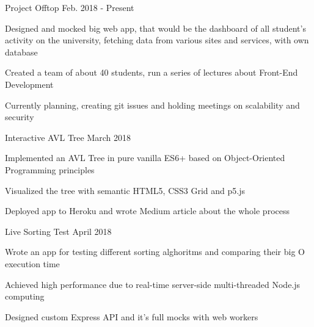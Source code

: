 
\begin{cventries}

  \cventryproject
  {Project Offtop} %
  {Feb. 2018 - Present} %
    {
      \begin{cvitems} %
        \item Designed and mocked big web app, that would be the dashboard of all student's activity on the university, fetching data from various sites and services, with own database
        \item Created a team of about 40 students, run a series of lectures about Front-End Development
        \item Currently planning, creating git issues and holding meetings on scalability and security
        \end{cvitems}
    }

\cventryproject
  {Interactive AVL Tree} %
  {March 2018} %
  {
    \begin{cvitems} %
      \item Implemented an AVL Tree in pure vanilla ES6+ based on Object-Oriented Programming principles
      \item Visualized the tree with semantic HTML5, CSS3 Grid and p5.js
      \item Deployed app to Heroku and wrote Medium article about the whole process
  \end{cvitems}
  }

\cventryproject
{Live Sorting Test} %
{April 2018} %
  {
    \begin{cvitems} %
      \item Wrote an app for testing different sorting alghoritms and comparing their big O execution time
      \item Achieved high performance due to real-time server-side multi-threaded Node.js computing
      \item Designed custom Express API and it's full mocks with web workers
  \end{cvitems}
  }


\end{cventries}
